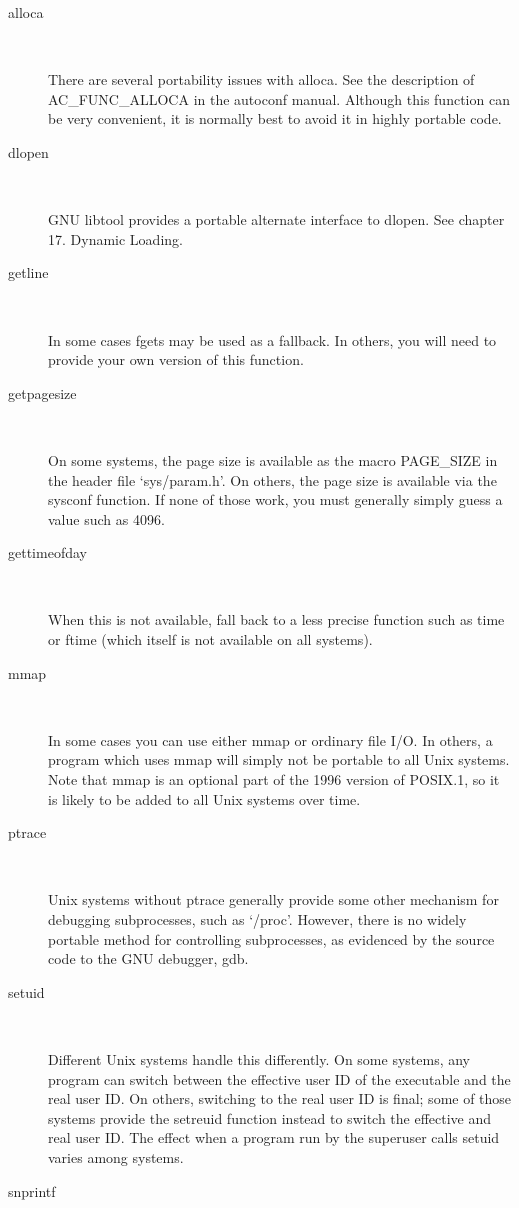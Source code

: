 \begin{description}
\item[alloca]
\

    There are several portability issues with alloca. See the description of AC\_{}FUNC\_{}ALLOCA in the autoconf manual. Although this function can be very convenient, it is normally best to avoid it in highly portable code. 
\item[dlopen]
\

GNU libtool provides a portable alternate interface to dlopen.
See chapter 17. Dynamic Loading. 
\item[getline]
\

    In some cases fgets may be used as a fallback. In others, you will need to provide your own version of this function. 
\item[getpagesize]
\

    On some systems, the page size is available as the macro PAGE\_{}SIZE in the header file `sys/param.h'. On others, the page size is available via the sysconf function. If none of those work, you must generally simply guess a value such as 4096. 
\item[gettimeofday]
\

    When this is not available, fall back to a less precise function such as time or ftime (which itself is not available on all systems). 
\item[mmap]
\

    In some cases you can use either mmap or ordinary file I/O. In others, a program which uses mmap will simply not be portable to all Unix systems. Note that mmap is an optional part of the 1996 version of POSIX.1, so it is likely to be added to all Unix systems over time. 
\item[ptrace]
\

    Unix systems without ptrace generally provide some other mechanism for debugging subprocesses, such as `/proc'. However, there is no widely portable method for controlling subprocesses, as evidenced by the source code to the GNU debugger, gdb. 
\item[setuid]
\

    Different Unix systems handle this differently. On some systems, any program can switch between the effective user ID of the executable and the real user ID. On others, switching to the real user ID is final; some of those systems provide the setreuid function instead to switch the effective and real user ID. The effect when a program run by the superuser calls setuid varies among systems. 
\item[snprintf]
\


\end{description}
